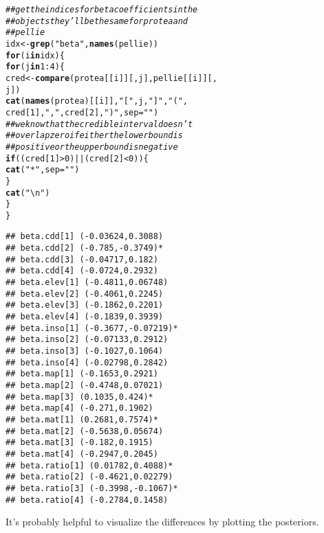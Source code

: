 \documentclass[12pt]{article}\usepackage[]{graphicx}\usepackage[]{color}
\makeatletter
\newcommand{\hlnum}[1]{\textcolor[rgb]{0.686,0.059,0.569}{#1}}%
\newcommand{\hlstr}[1]{\textcolor[rgb]{0.192,0.494,0.8}{#1}}%
\newcommand{\hlcom}[1]{\textcolor[rgb]{0.678,0.584,0.686}{\textit{#1}}}%
\newcommand{\hlopt}[1]{\textcolor[rgb]{0,0,0}{#1}}%
\newcommand{\hlstd}[1]{\textcolor[rgb]{0.345,0.345,0.345}{#1}}%
\newcommand{\hlkwa}[1]{\textcolor[rgb]{0.161,0.373,0.58}{\textbf{#1}}}%
\newcommand{\hlkwb}[1]{\textcolor[rgb]{0.69,0.353,0.396}{#1}}%
\newcommand{\hlkwc}[1]{\textcolor[rgb]{0.333,0.667,0.333}{#1}}%
\newcommand{\hlkwd}[1]{\textcolor[rgb]{0.737,0.353,0.396}{\textbf{#1}}}%
\newenvironment{kframe}{%
 \def\at@end@of@kframe{}%
 \ifinner\ifhmode%
  \def\at@end@of@kframe{\end{minipage}}%
  \begin{minipage}{\columnwidth}%
 \fi\fi%
 \def\FrameCommand##1{\hskip\@totalleftmargin \hskip-\fboxsep
 \colorbox{shadecolor}{##1}\hskip-\fboxsep
     \hskip-\linewidth \hskip-\@totalleftmargin \hskip\columnwidth}%
 \MakeFramed {\advance\hsize-\width
   \@totalleftmargin\z@ \linewidth\hsize
   \@setminipage}}%
 {\par\unskip\endMakeFramed%
 \at@end@of@kframe}
\newenvironment{knitrout}{}{} %
\makeatother
\begin{document}
\begin{knitrout}
\color{fgcolor}\begin{kframe}
\begin{alltt}
\hlcom{## get the indices for beta coefficients in the}
\hlcom{## objects they'll be the same for protea and}
\hlcom{## pellie}
\hlstd{idx} \hlkwb{<-} \hlkwd{grep}\hlstd{(}\hlstr{"beta"}\hlstd{,} \hlkwd{names}\hlstd{(pellie))}
\hlkwa{for} \hlstd{(i} \hlkwa{in} \hlstd{idx) \{}
  \hlkwa{for} \hlstd{(j} \hlkwa{in} \hlnum{1}\hlopt{:}\hlnum{4}\hlstd{) \{}
    \hlstd{cred} \hlkwb{<-} \hlkwd{compare}\hlstd{(protea[[i]][, j], pellie[[i]][,}
      \hlstd{j])}
    \hlkwd{cat}\hlstd{(}\hlkwd{names}\hlstd{(protea)[[i]],} \hlstr{"["}\hlstd{, j,} \hlstr{"]"}\hlstd{,} \hlstr{" ("}\hlstd{,}
      \hlstd{cred[}\hlnum{1}\hlstd{],} \hlstr{","}\hlstd{, cred[}\hlnum{2}\hlstd{],} \hlstr{")"}\hlstd{,} \hlkwc{sep} \hlstd{=} \hlstr{""}\hlstd{)}
    \hlcom{## we know that the credible interval doesn't}
    \hlcom{## overlap zero if either the lower bound is}
    \hlcom{## positive or the upper bound is negative}
    \hlkwa{if} \hlstd{((cred[}\hlnum{1}\hlstd{]} \hlopt{>} \hlnum{0}\hlstd{)} \hlopt{||} \hlstd{(cred[}\hlnum{2}\hlstd{]} \hlopt{<} \hlnum{0}\hlstd{)) \{}
      \hlkwd{cat}\hlstd{(}\hlstr{"*"}\hlstd{,} \hlkwc{sep} \hlstd{=} \hlstr{""}\hlstd{)}
    \hlstd{\}}
    \hlkwd{cat}\hlstd{(}\hlstr{"\textbackslash{}n"}\hlstd{)}
  \hlstd{\}}
\hlstd{\}}
\end{alltt}
\begin{verbatim}
## beta.cdd[1] (-0.03624,0.3088)
## beta.cdd[2] (-0.785,-0.3749)*
## beta.cdd[3] (-0.04717,0.182)
## beta.cdd[4] (-0.0724,0.2932)
## beta.elev[1] (-0.4811,0.06748)
## beta.elev[2] (-0.4061,0.2245)
## beta.elev[3] (-0.1862,0.2201)
## beta.elev[4] (-0.1839,0.3939)
## beta.inso[1] (-0.3677,-0.07219)*
## beta.inso[2] (-0.07133,0.2912)
## beta.inso[3] (-0.1027,0.1064)
## beta.inso[4] (-0.02798,0.2842)
## beta.map[1] (-0.1653,0.2921)
## beta.map[2] (-0.4748,0.07021)
## beta.map[3] (0.1035,0.424)*
## beta.map[4] (-0.271,0.1902)
## beta.mat[1] (0.2681,0.7574)*
## beta.mat[2] (-0.5638,0.05674)
## beta.mat[3] (-0.182,0.1915)
## beta.mat[4] (-0.2947,0.2045)
## beta.ratio[1] (0.01782,0.4088)*
## beta.ratio[2] (-0.4621,0.02279)
## beta.ratio[3] (-0.3998,-0.1067)*
## beta.ratio[4] (-0.2784,0.1458)
\end{verbatim}
\end{kframe}
\end{knitrout}

It's probably helpful to visualize the differences by plotting the
posteriors.
\end{document}
